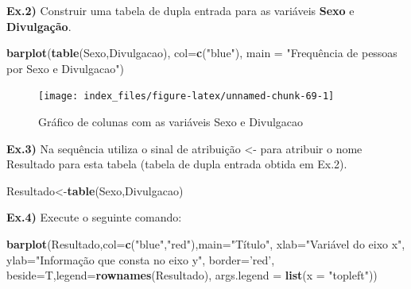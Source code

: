 \documentclass[12pt,portuguese,oneside]{book}
\newenvironment{Shaded}{\begin{snugshade}}{\end{snugshade}}
\newcommand{\KeywordTok}[1]{\textcolor[rgb]{0.13,0.29,0.53}{\textbf{#1}}}
\newcommand{\DataTypeTok}[1]{\textcolor[rgb]{0.13,0.29,0.53}{#1}}
\newcommand{\StringTok}[1]{\textcolor[rgb]{0.31,0.60,0.02}{#1}}
\newcommand{\NormalTok}[1]{#1}
\begin{document}
\textbf{Ex.2)} Construir uma tabela de dupla entrada para as variáveis
\textbf{Sexo} e \textbf{Divulgação}.

\begin{Shaded}
\begin{Highlighting}[]
\KeywordTok{barplot}\NormalTok{(}\KeywordTok{table}\NormalTok{(Sexo,Divulgacao), }
        \DataTypeTok{col=}\KeywordTok{c}\NormalTok{(}\StringTok{"blue"}\NormalTok{), }
        \DataTypeTok{main =} \StringTok{"Frequência de pessoas por Sexo e Divulgacao"}\NormalTok{)}
\end{Highlighting}
\end{Shaded}

\begin{figure}[H]

{\centering \texttt{[image: index\_files/figure-latex/unnamed-chunk-69-1]} 

}

\caption{Gráfico de colunas com as variáveis Sexo e Divulgacao}\label{fig:unnamed-chunk-69}
\end{figure}

\textbf{Ex.3)} Na sequência utiliza o sinal de atribuição \textless{}-
para atribuir o nome Resultado para esta tabela (tabela de dupla entrada
obtida em Ex.2).

\begin{Shaded}
\begin{Highlighting}[]
\NormalTok{Resultado<-}\KeywordTok{table}\NormalTok{(Sexo,Divulgacao)}
\end{Highlighting}
\end{Shaded}

\textbf{Ex.4)} Execute o seguinte comando:

\begin{Shaded}
\begin{Highlighting}[]
\KeywordTok{barplot}\NormalTok{(Resultado,}\DataTypeTok{col=}\KeywordTok{c}\NormalTok{(}\StringTok{"blue"}\NormalTok{,}\StringTok{"red"}\NormalTok{),}\DataTypeTok{main=}\StringTok{"Título"}\NormalTok{,}
        \DataTypeTok{xlab=}\StringTok{"Variável do eixo x"}\NormalTok{,}
        \DataTypeTok{ylab=}\StringTok{"Informação que consta no eixo y"}\NormalTok{, }
        \DataTypeTok{border=}\StringTok{'red'}\NormalTok{, }
        \DataTypeTok{beside=}\NormalTok{T,}\DataTypeTok{legend=}\KeywordTok{rownames}\NormalTok{(Resultado),}
        \DataTypeTok{args.legend =} \KeywordTok{list}\NormalTok{(}\DataTypeTok{x =} \StringTok{"topleft"}\NormalTok{))}
\end{Highlighting}
\end{Shaded}
\end{document}
